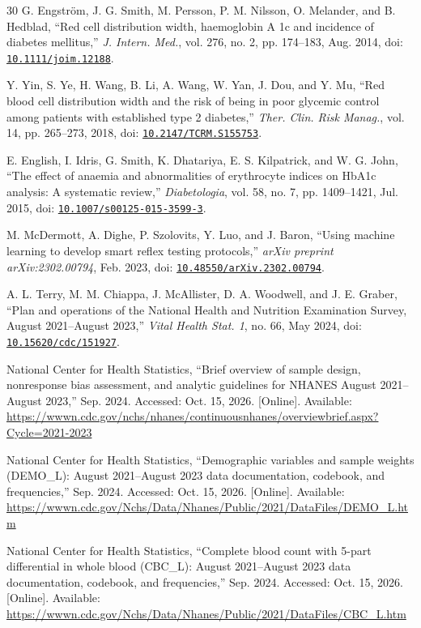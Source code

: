 \documentclass[conference]{IEEEtran}
\newcommand{\doi}[1]{\href{https://doi.org/#1}{\nolinkurl{#1}}}
\begin{document}
\begin{thebibliography}{30}
G. Engstr\"om, J. G. Smith, M. Persson, P. M. Nilsson, O. Melander, and B. Hedblad, ``Red cell distribution width, haemoglobin A 1c and incidence of diabetes mellitus,'' \emph{J. Intern. Med.}, vol. 276, no. 2, pp. 174--183, Aug. 2014, doi: \doi{10.1111/joim.12188}.

Y. Yin, S. Ye, H. Wang, B. Li, A. Wang, W. Yan, J. Dou, and Y. Mu, ``Red blood cell distribution width and the risk of being in poor glycemic control among patients with established type 2 diabetes,'' \emph{Ther. Clin. Risk Manag.}, vol. 14, pp. 265--273, 2018, doi: \doi{10.2147/TCRM.S155753}.

E. English, I. Idris, G. Smith, K. Dhatariya, E. S. Kilpatrick, and W. G. John, ``The effect of anaemia and abnormalities of erythrocyte indices on HbA1c analysis: A systematic review,'' \emph{Diabetologia}, vol. 58, no. 7, pp. 1409--1421, Jul. 2015, doi: \doi{10.1007/s00125-015-3599-3}.

M. McDermott, A. Dighe, P. Szolovits, Y. Luo, and J. Baron, ``Using machine learning to develop smart reflex testing protocols,'' \emph{arXiv preprint arXiv:2302.00794}, Feb. 2023, doi: \doi{10.48550/arXiv.2302.00794}.

A. L. Terry, M. M. Chiappa, J. McAllister, D. A. Woodwell, and J. E. Graber, ``Plan and operations of the National Health and Nutrition Examination Survey, August 2021--August 2023,'' \emph{Vital Health Stat. 1}, no. 66, May 2024, doi: \doi{10.15620/cdc/151927}.

National Center for Health Statistics, ``Brief overview of sample design, nonresponse bias assessment, and analytic guidelines for NHANES August 2021--August 2023,'' Sep. 2024. Accessed: Oct. 15, 2026. [Online]. Available: \url{https://wwwn.cdc.gov/nchs/nhanes/continuousnhanes/overviewbrief.aspx?Cycle=2021-2023}

National Center for Health Statistics, ``Demographic variables and sample weights (DEMO\_L): August 2021--August 2023 data documentation, codebook, and frequencies,'' Sep. 2024. Accessed: Oct. 15, 2026. [Online]. Available: \url{https://wwwn.cdc.gov/Nchs/Data/Nhanes/Public/2021/DataFiles/DEMO_L.htm}

National Center for Health Statistics, ``Complete blood count with 5-part differential in whole blood (CBC\_L): August 2021--August 2023 data documentation, codebook, and frequencies,'' Sep. 2024. Accessed: Oct. 15, 2026. [Online]. Available: \url{https://wwwn.cdc.gov/Nchs/Data/Nhanes/Public/2021/DataFiles/CBC_L.htm}


\end{thebibliography}
\end{document}
